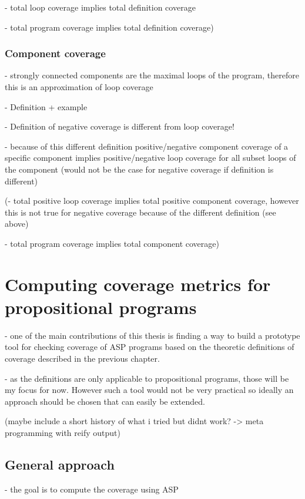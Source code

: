 - total loop coverage implies total definition coverage

- total program coverage implies total definition coverage)

\subsection{Component coverage}
\label{subsec:Coverage cetrics/Branch-like coverage/Component coverage}
- strongly connected components are the maximal loops of the program, therefore this is an approximation of loop coverage

- Definition + example

- Definition of negative coverage is different from loop coverage!

- because of this different definition positive/negative component coverage of a specific component implies positive/negative loop 
coverage for all subset loops of the component (would not be the case for negative coverage if definition is different)

(- total positive loop coverage implies total positive component coverage, however this is not true for negative coverage because 
of the different definition (see above)

- total program coverage implies total component coverage)

\chapter{Computing coverage metrics for propositional programs}
\label{ch:Computing coverage metrics for propositional programs}
- one of the main contributions of this thesis is finding a way to build a prototype tool for checking coverage of ASP programs 
based on the theoretic definitions of coverage described in the previous chapter.

- as the definitions are only applicable to propositional programs, those will be my focus for now. However such a tool would not 
be very practical so ideally an approach should be chosen that can easily be extended.

(maybe include a short history of what i tried but didnt work? -> meta programming with reify output)

\section{General approach}
\label{sec:Computing coverage metrics for propositional programs/General approach}
- the goal is to compute the coverage using ASP

